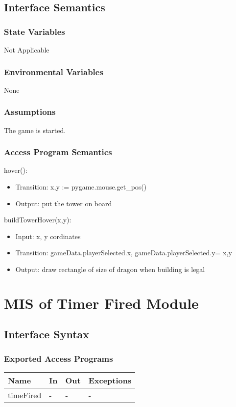 \documentclass[12,english]{article}
\begin{document}
\subsection{Interface Semantics}
\subsubsection{State Variables}
Not Applicable
\subsubsection{Environmental Variables}
None
\subsubsection{Assumptions}
The game is started. 
\subsubsection{Access Program Semantics}

\noindent hover():
\begin{itemize}
    \item Transition: x,y := pygame.mouse.get\_pos()
    \item Output: put the tower on board
\end{itemize}

\noindent buildTowerHover(x,y):
\begin{itemize}
    \item Input: x, y cordinates
    \item Transition: gameData.playerSelected.x, gameData.playerSelected.y= x,y
    \item Output: draw rectangle of size of dragon when building is legal
\end{itemize}

\section{MIS of Timer Fired Module}
\subsection{Interface Syntax}
\subsubsection{Exported Access Programs}
\begin{table}[h!]
    \centering
    \begin{tabular}{|p{4cm}|p{2cm}|p{2cm}|p{2cm}|}
    \hline
    \textbf {Name}  & {In} & {Out} & {Exceptions} \\
    \hline
    timeFired & - & - & -\\
    \hline 
    \end{tabular}
\end{table}
\end{document}
